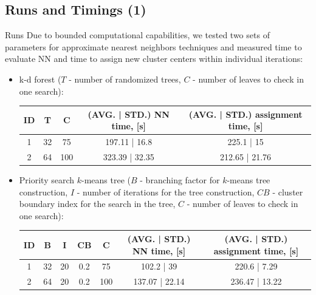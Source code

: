 \subsection{Runs and Timings (1)}

\begin{frame}
	\begin{block}{Runs}
		Due to bounded computational capabilities, we tested two sets of parameters for approximate nearest neighbors techniques and measured time to evaluate NN and time to assign new cluster centers within individual iterations:
		
		\begin{itemize}
			\item k-d forest ($T$ - number of randomized trees, $C$ - number of leaves to check in one search):
			\begin{table}
				\scriptsize
				\begin{tabular}{| c || c | c | c | c |}
					\hline
					ID & T & C & (AVG. | STD.) NN time, [s] & (AVG. | STD.) assignment time, [s] \\
					\hline
					\hline			
					1 & 32 & 75 & 197.11 | 16.8 & 225.1 | 15 \\
					2 & 64 & 100 & 323.39 | 32.35 & 212.65 | 21.76 \\
					\hline  
				\end{tabular}
			\end{table}
			\item Priority search $k$-means tree ($B$ - branching factor for $k$-means tree construction, $I$ - number of iterations for the tree construction, $CB$ - cluster boundary index for the search in the tree, $C$ - number of leaves to check in one search):
			\begin{table}
				\scriptsize
				\begin{tabular}{| c || c | c | c | c | c | c |}
					\hline
					ID & B & I & CB & C & (AVG. | STD.) NN time, [s] & (AVG. | STD.) assignment time, [s] \\
					\hline
					\hline			
					1 & 32 & 20 & 0.2 & 75 & 102.2 | 39 & 220.6 | 7.29 \\
					2 & 64 & 20 & 0.2 & 100 & 137.07 | 22.14 & 236.47 | 13.22 \\
					\hline  
				\end{tabular}
			\end{table}
		\end{itemize}
	\end{block}
\end{frame}

